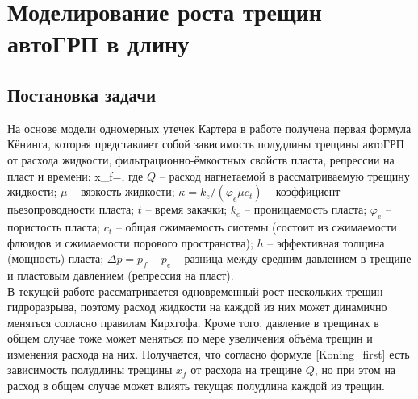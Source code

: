 \chapter{Моделирование роста трещин автоГРП в длину} \label{ch3}

\section{Постановка задачи}
\vspace*{-5mm}

На основе модели одномерных утечек Картера \cite{karter} в работе \cite{koning} получена первая формула Кёнинга, которая представляет собой зависимость полудлины трещины автоГРП от расхода жидкости, фильтрационно-ёмкостных свойств пласта, репрессии на пласт и времени:
\beq\label{Koning_first}
x_{\!f}=,
\eeq
где $Q$ -- расход нагнетаемой в рассматриваемую трещину жидкости;
$\mu$ -- вязкость жидкости;
$\kappa=k_e/(\varphi_e\mu c_t)$ -- коэффициент пьезопроводности пласта;
$t$ -- время закачки;
$k_e$ -- проницаемость пласта;
$\varphi_e$ -- пористость пласта;
$c_t$ -- общая сжимаемость системы (состоит из сжимаемости флюидов и сжимаемости порового пространства);
$h$ -- эффективная толщина (мощность) пласта;
$\Delta p=p_{\!f}-p_e$ -- разница между средним давлением в трещине и пластовым давлением (репрессия на пласт).\\

В текущей работе рассматривается одновременный рост нескольких трещин гидроразрыва, поэтому расход жидкости на каждой из них может динамично меняться согласно правилам Кирхгофа.
Кроме того, давление в трещинах в общем случае тоже может меняться по мере увеличения объёма трещин и изменения расхода на них.
Получается, что согласно формуле \eqref{Koning_first} есть зависимость полудлины трещины $x_{\!f}$ от расхода на трещине $Q$, но при этом на расход в общем случае может влиять текущая полудлина каждой из трещин.


